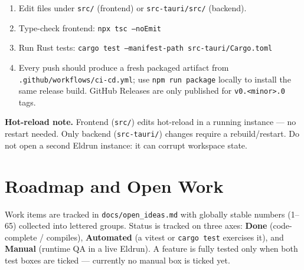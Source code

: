 \documentclass[11pt,a4paper]{article}
\newcommand{\done}{\textcolor{donegreen}{\textbf{Done}}}
\newcommand{\code}[1]{\texttt{#1}}
\begin{document}
\begin{enumerate}
  \item Edit files under \code{src/} (frontend) or \code{src-tauri/src/}
  (backend).
  \item Type-check frontend: \code{npx tsc --noEmit}
  \item Run Rust tests: \code{cargo test --manifest-path src-tauri/Cargo.toml}
  \item Every push should produce a fresh packaged artifact from
  \code{.github/workflows/ci-cd.yml}; use \code{npm run package} locally to
  install the same release build. GitHub Releases are only published for
  \code{v0.<minor>.0} tags.
\end{enumerate}

\noindent\textbf{Hot-reload note.} Frontend (\code{src/}) edits hot-reload in a
running instance --- no restart needed. Only backend (\code{src-tauri/}) changes
require a rebuild/restart. Do not open a second Eldrun instance: it can corrupt
workspace state.

\section{Roadmap and Open Work}

Work items are tracked in \code{docs/open\_ideas.md} with globally stable
numbers (1--65) collected into lettered groups. Status is tracked on three axes:
\done{} (code-complete / compiles), \textbf{Automated} (a vitest or
\code{cargo test} exercises it), and \textbf{Manual} (runtime QA in a live
Eldrun). A feature is fully tested only when both test boxes are ticked ---
currently no manual box is ticked yet.
\end{document}

